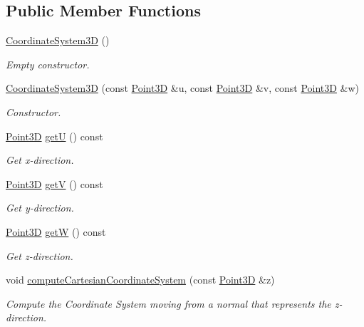 \subsection*{Public Member Functions}
\begin{DoxyCompactItemize}
\item 
\hyperlink{classFVCode3D_1_1CoordinateSystem3D_afa4c48d3b3cec16bdbe729d4b08afe8c}{Coordinate\+System3D} ()
\begin{DoxyCompactList}\small\item\em Empty constructor. \end{DoxyCompactList}\item 
\hyperlink{classFVCode3D_1_1CoordinateSystem3D_a09eaccea445dc8d22c2ef6d41205d51a}{Coordinate\+System3D} (const \hyperlink{classFVCode3D_1_1Point3D}{Point3D} \&u, const \hyperlink{classFVCode3D_1_1Point3D}{Point3D} \&v, const \hyperlink{classFVCode3D_1_1Point3D}{Point3D} \&w)
\begin{DoxyCompactList}\small\item\em Constructor. \end{DoxyCompactList}\item 
\hyperlink{classFVCode3D_1_1Point3D}{Point3D} \hyperlink{classFVCode3D_1_1CoordinateSystem3D_ae08d47f5bef59209fc0814f9dd7b621c}{getU} () const 
\begin{DoxyCompactList}\small\item\em Get x-\/direction. \end{DoxyCompactList}\item 
\hyperlink{classFVCode3D_1_1Point3D}{Point3D} \hyperlink{classFVCode3D_1_1CoordinateSystem3D_a3ae9763795c5dc8ac6cbd14d8328488c}{getV} () const 
\begin{DoxyCompactList}\small\item\em Get y-\/direction. \end{DoxyCompactList}\item 
\hyperlink{classFVCode3D_1_1Point3D}{Point3D} \hyperlink{classFVCode3D_1_1CoordinateSystem3D_a88b87127a11f8fb54b9aac8a46145c21}{getW} () const 
\begin{DoxyCompactList}\small\item\em Get z-\/direction. \end{DoxyCompactList}\item 
void \hyperlink{classFVCode3D_1_1CoordinateSystem3D_a1e4e37cb99a7f93940ed0fcc3f1c3b85}{compute\+Cartesian\+Coordinate\+System} (const \hyperlink{classFVCode3D_1_1Point3D}{Point3D} \&z)
\begin{DoxyCompactList}\small\item\em Compute the Coordinate System moving from a normal that represents the z-\/direction. \end{DoxyCompactList}\end{DoxyCompactItemize}
